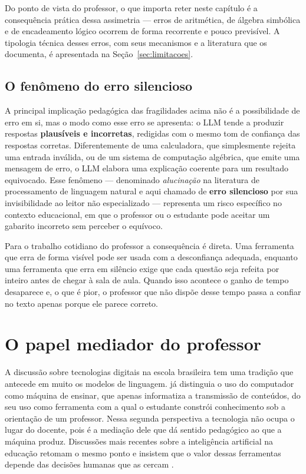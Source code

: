 Do ponto de vista do professor, o que importa reter neste capítulo é a consequência prática dessa
assimetria --- erros de aritmética, de álgebra simbólica e de encadeamento lógico ocorrem de forma
recorrente e pouco previsível. A tipologia técnica desses erros, com seus mecanismos e a
literatura que os documenta, é apresentada na Seção~\ref{sec:limitacoes}.

\subsection{O fenômeno do erro silencioso}
\label{sec:erro-silencioso}


A principal implicação pedagógica das fragilidades acima não é a possibilidade de erro em si, mas o
modo como esse erro se apresenta: o LLM tende a produzir respostas \textbf{plausíveis e
incorretas}, redigidas com o mesmo tom de confiança das respostas corretas. Diferentemente de uma
calculadora, que simplesmente rejeita uma entrada inválida, ou de um sistema de computação
algébrica, que emite uma mensagem de erro, o LLM elabora uma explicação coerente para um resultado
equivocado. Esse fenômeno --- denominado \emph{alucinação} na literatura de processamento de
linguagem natural e aqui chamado de \textbf{erro silencioso} por sua invisibilidade ao leitor não
especializado --- representa um risco específico no contexto educacional, em que o professor ou o
estudante pode aceitar um gabarito incorreto sem perceber o equívoco.

Para o trabalho cotidiano do professor a consequência é direta. Uma ferramenta que erra de forma
visível pode ser usada com a desconfiança adequada, enquanto uma ferramenta que erra em silêncio
exige que cada questão seja refeita por inteiro antes de chegar à sala de aula. Quando isso
acontece o ganho de tempo desaparece e, o que é pior, o professor que não dispõe desse tempo passa
a confiar no texto apenas porque ele parece correto.

\section{O papel mediador do professor}
\label{sec:papel-mediador}

A discussão sobre tecnologias digitais na escola brasileira tem uma tradição que antecede em
muito os modelos de linguagem. \citet{valente1999computador} já distinguia o uso do computador
como máquina de ensinar, que apenas informatiza a transmissão de conteúdos, do seu uso como
ferramenta com a qual o estudante constrói conhecimento sob a orientação de um professor. Nessa
segunda perspectiva a tecnologia não ocupa o lugar do docente, pois é a mediação dele que dá
sentido pedagógico ao que a máquina produz. Discussões mais recentes sobre a inteligência
artificial na educação retomam o mesmo ponto e insistem que o valor dessas ferramentas depende das
decisões humanas que as cercam \citep{holmes2019aied}.


